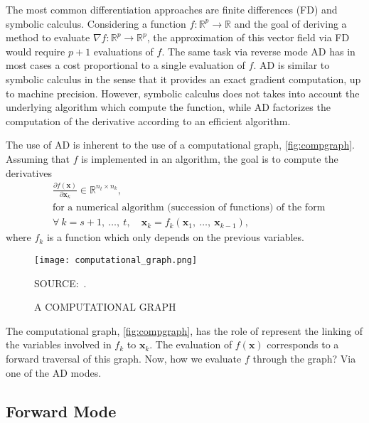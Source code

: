 The most common differentiation approaches are finite differences (FD)
and symbolic calculus. Considering a function \(f: \mathbb{R}^{p}
\rightarrow \mathbb{R}\) and the goal of deriving a method to evaluate
\(\nabla f: \mathbb{R}^{p} \rightarrow \mathbb{R}^{p}\), the
approximation of this vector field via FD would require \(p + 1\)
evaluations of \(f\). The same task via reverse mode AD has in most
cases a cost proportional to a single evaluation of \(f\). AD is similar
to symbolic calculus in the sense that it provides an exact gradient
computation, up to machine precision. However, symbolic calculus does
not takes into account the underlying algorithm which compute the
function, while AD factorizes the computation of the derivative
according to an efficient algorithm.

The use of AD is inherent to the use of a computational graph,
\autoref{fig:compgraph}. Assuming that \(f\) is implemented in an
algorithm, the goal is to compute the derivatives
\begin{align*}
  &\frac{\partial f(\bm{x})}{\partial\bm{x}_{k}}\in
  \mathbb{R}^{n_{t} \times n_{k}},\\
  &\text{for a numerical algorithm
         (succession of functions) of the form}\\
  &\forall~k = s + 1,~\dots,~t,\quad
    \bm{x}_{k} = f_{k}(\bm{x}_{1},~\dots,~\bm{x}_{k-1}),
\end{align*}
where \(f_{k}\) is a function which only depends on the previous
variables.

\begin{figure}[H]
  \setlength{\abovecaptionskip}{.0001pt}
  \caption{A COMPUTATIONAL GRAPH}
  \vspace{0.3cm} \centering
  \texttt{[image: computational\_graph.png]}
  \\
  \vspace{0.3cm}
  \begin{footnotesize}
    SOURCE:~.
  \end{footnotesize}
  \label{fig:compgraph}
\end{figure}

The computational graph, \autoref{fig:compgraph}, has the role of
represent the linking of the variables involved in \(f_{k}\) to
\(\bm{x}_{k}\). The evaluation of \(f(\bm{x})\) corresponds to a
forward traversal of this graph. Now, how we evaluate \(f\) through the
graph? Via one of the AD modes.

\subsection{Forward Mode}


